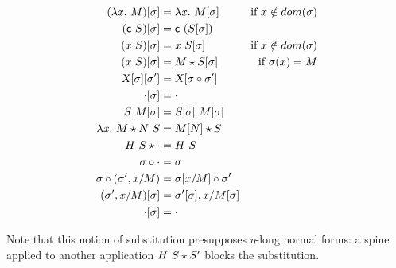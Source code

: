 \documentclass[9pt]{sigplanconf}
\begin{document}
\begin{align*}
  {(\lambda{\ensuremath{\text{\textit{x}}}}.\ M)}[{\sigma}] &= \lambda{\ensuremath{\text{\textit{x}}}}.\  {{M}[{\sigma}]} &
  \text{if $x\notin dom{(\sigma)}$}
  \\
  {({\text{\textsf{c}}}\  S)}[{\sigma}] &= {\text{\textsf{c}}}\  {({S}[{\sigma}])}
  \\
  {({\text{\textit{x}}}\  S)}[{\sigma}] &=
  {\text{\textit{x}}}\  {{S}[{\sigma}]} &
  \text{if $x\notin dom{(\sigma)}$}
  \\
  {({\text{\textit{x}}}\  S)}[{\sigma}] &=
  {M}\star{{S}[{\sigma}]} &
  \text{if $\sigma(x) = M$}
  \\
  {{\text{\textsl{X}}}[{\sigma}]}[{\sigma'}] &=
  {\text{\textsl{X}}}[{{\sigma}\circ{\sigma'}}]
  \\
  {\cdot}[{\sigma}] &=
  \cdot \\
  {{S}\ {M}}[{\sigma}] &=
  {{S}[{\sigma}]}\ {{M}[{\sigma}]}
  \\
  {\lambda{\ensuremath{\text{\textit{x}}}}.\  M}\star{{N}\ {S}} &=
  {{M}[{N}]}\star{S}
  \\
  {{H}\  S}\star{\cdot} &=
  {H}\  S
  \\
  {\sigma}\circ{\cdot} &=
  \sigma
  \\
  {\sigma}\circ{({\sigma'},{{\ensuremath{\text{\textit{x}}}}/{M}})} &=
  {{\sigma}[{{\text{\textit{x}}}/{M}}]}\circ{\sigma}'
  \\
  {({\sigma'},{{\text{\textit{x}}}/{M}})}[{\sigma}] &=
  {{\sigma'}[{\sigma}]},{{\text{\textit{x}}}/{{M}[{\sigma}]}}
  \\
  {\cdot}[{\sigma}] &= \cdot
\end{align*}

Note that this notion of substitution presupposes $\eta$-long normal
forms: a spine applied to another application ${{H}\  S}\star{S'}$
blocks the substitution.







\end{document}
